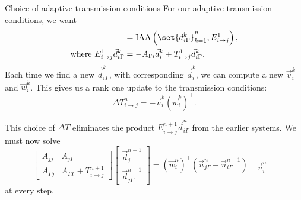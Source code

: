 \documentclass{beamer}
\DeclareMathOperator{\iaa}{IAA} %
\begin{document}
\begin{frame}{Choice of adaptive transmission conditions}
For our adaptive transmission conditions, we want
\begin{align*}
	[ V_i^n, W_i^n ] & = \iaa \left ( \set{ \vec{d}_{i \Gamma}^k }_{k=1}^n, E_{i \to j}^1 \right ), \\
	\text{where} \ E_{i \to j}^1 \vec{d}_{i \Gamma}^k & = -A_{\Gamma i} \vec{d}_i^k + T_{i \to j}^1 \vec{d}_{i \Gamma}^k.
\end{align*}
Each time we find a new $\vec{d}_{i \Gamma}^k$, with corresponding $\vec{d}_i^k$, we can compute a new $\vec{v}_i^k$ and $\vec{w}_i^k$.
This gives us a rank one update to the transmission conditions:
\begin{equation*}
	\Delta T_{i \to j}^n = - \vec{v}_i^k \left ( \vec{w}_i^k \right )^\top.
\end{equation*}

This choice of $\Delta T$ eliminates the product $E_{i \to j}^{n+1} \vec{d}_{i \Gamma}^n$ from the earlier systems.
We must now solve
\begin{equation*}
	\begin{bmatrix} A_{jj} & A_{j \Gamma} \\ A_{\Gamma j} & A_{\Gamma \Gamma} + T_{i \to j}^{n+1} \end{bmatrix}
	\begin{bmatrix} \vec{d}_j^{n+1} \\ \vec{d}_{j \Gamma}^{n+1} \end{bmatrix}
	= (\vec{w}_i^n)^\top \left ( \vec{u}_{j \Gamma}^n - \vec{u}_{i \Gamma}^{n-1} \right )\begin{bmatrix} ~ \\ \vec{v}_i^n \end{bmatrix}
\end{equation*}
at every step.
\end{frame}
\end{document}
